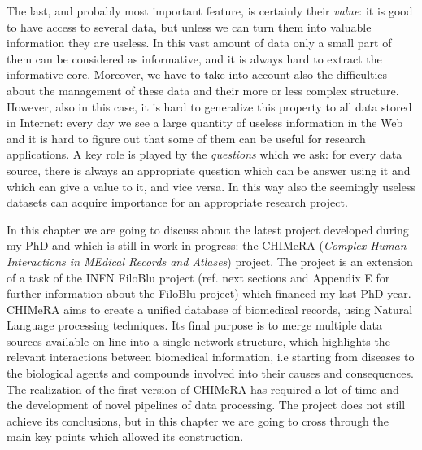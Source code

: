 \documentclass{standalone}
\begin{document}
The last, and probably most important feature, is certainly their \emph{value}: it is good to have access to several data, but unless we can turn them into valuable information they are useless.
In this vast amount of data only a small part of them can be considered as informative, and it is always hard to extract the informative core.
Moreover, we have to take into account also the difficulties about the management of these data and their more or less complex structure.
However, also in this case, it is hard to generalize this property to all data stored in Internet: every day we see a large quantity of useless information in the Web and it is hard to figure out that some of them can be useful for research applications.
A key role is played by the \emph{questions} which we ask: for every data source, there is always an appropriate question which can be answer using it and which can give a value to it, and vice versa.
In this way also the seemingly useless datasets can acquire importance for an appropriate research project.

In this chapter we are going to discuss about the latest project developed during my PhD and which is still in work in progress: the \textsf{CHIMeRA} (\emph{Complex Human Interactions in MEdical Records and Atlases}) project.
The project is an extension of a task of the INFN FiloBlu project (ref. next sections and Appendix E for further information about the FiloBlu project) which financed my last PhD year.
\textsf{CHIMeRA} aims to create a unified database of biomedical records, using Natural Language processing techniques.
Its final purpose is to merge multiple data sources available on-line into a single network structure, which highlights the relevant interactions between biomedical information, i.e starting from diseases to the biological agents and compounds involved into their causes and consequences.
The realization of the first version of \textsf{CHIMeRA} has required a lot of time and the development of novel pipelines of data processing.
The project does not still achieve its conclusions, but in this chapter we are going to cross through the main key points which allowed its construction.

\end{document}
